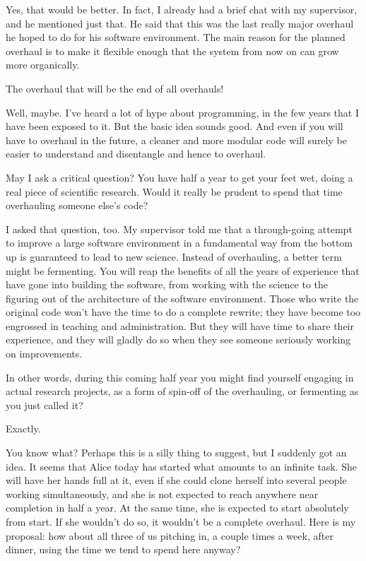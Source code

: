 \alice
Yes, that would be better.  In fact, I already had a brief chat
with my supervisor, and he mentioned just that.  He said that this was
the last really major overhaul he hoped to do for his software
environment.  The main reason for the planned overhaul is to make
it flexible enough that the system from now on can grow more
organically.

\bob
The overhaul that will be the end of all overhauls!

\carol
Well, maybe.  I've heard a lot of hype about programming, in
the few years that I have been exposed to it.  But the basic idea
sounds good.  And even if you will have to overhaul in the future, a
cleaner and more modular code will surely be easier to understand and
disentangle and hence to overhaul.

\bob
May I ask a critical question?  You have half a year to get your
feet wet, doing a real piece of scientific research.  Would it really
be prudent to spend that time overhauling someone else's code?

\alice
I asked that question, too.  My supervisor told me that a
through-going attempt to improve a large software environment in a
fundamental way from the bottom up is guaranteed to lead to new
science.  Instead of overhauling, a better term might be fermenting.
You will reap the benefits of all the years of experience that have
gone into building the software, from working with the science to the
figuring out of the architecture of the software environment.  Those
who write the original code won't have the time to do a complete
rewrite; they have become too engrossed in teaching and administration.
But they will have time to share their experience, and they will
gladly do so when they see someone seriously working on improvements.

\carol
In other words, during this coming half year you might find
yourself engaging in actual research projects, as a form of spin-off
of the overhauling, or fermenting as you just called it?

\alice
Exactly.

\bob
You know what?  Perhaps this is a silly thing to suggest, but I
suddenly got an idea.  It seems that Alice today has started what
amounts to an infinite task.  She will have her hands full at it, even
if she could clone herself into several people working simultaneously,
and she is not expected to reach anywhere near completion in half a year.
At the same time, she is expected to start absolutely from start.  If
she wouldn't do so, it wouldn't be a complete overhaul.  Here is my
proposal: how about all three of us pitching in, a couple times a
week, after dinner, using the time we tend to spend here anyway?

